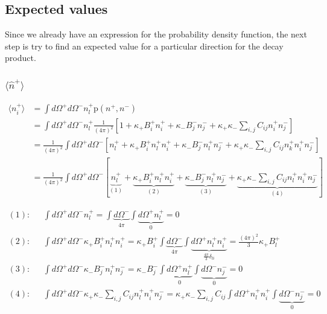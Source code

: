 \documentclass[onecolumn, amsmath, amssymb, aps, prd]{revtex4-2}
\begin{document}
	\subsection{Expected values}
		Since we already have an expression for the probability density function, the next step is try to find an expected value for a particular direction for the decay product.

		\subsubsection{$\langle \hat{n}^+ \rangle$}
			\begin{equation}
				\begin{split}
					\langle n_i^+ \rangle & = \int d\Omega^+ d\Omega^- n_l^+ \text{p}(n^+, n^-) \\
					& = \int d\Omega^+ d\Omega^- n_l^+ \frac{1}{(4\pi)^2} \left[ 1 + \kappa_+ B_i^+ n_i^+ + \kappa_- B_j^- n_j^- + \kappa_+ \kappa_- \sum_{i,j} C_{ij} n_i^+ n_j^- \right] \\
					& = \frac{1}{(4\pi)^2} \int d\Omega^+ d\Omega^- \left[ n_l^+ + \kappa_+ B_i^+ n_l^+ n_i^+ + \kappa_- B_j^- n_l^+ n_j^- + \kappa_+ \kappa_- \sum_{i,j} C_{ij} n_k^+ n_i^+ n_j^- \right] \\
					& = \frac{1}{(4\pi)^2} \int d\Omega^+ d\Omega^- \left[ \underbrace{n_l^+}_{(1)} + \underbrace{\kappa_+ B_i^+ n_l^+ n_i^+}_{(2)} + \underbrace{\kappa_- B_j^- n_l^+ n_j^-}_{(3)} + \underbrace{\kappa_+ \kappa_- \sum_{i,j} C_{ij} n_l^+ n_i^+ n_j^-}_{(4)} \right]
				\end{split}
			\end{equation}

			\begin{equation}
				\begin{split}
					(1): \ \ \ & \int d\Omega^+ d\Omega^- n_l^+ = \int \underbrace{d\Omega^-}_{4\pi} \int \underbrace{d\Omega^+ n_l^+}_{0} = 0 \\
					(2): \ \ \ & \int d\Omega^+ d\Omega^- \kappa_+ B_i^+ n_l^+ n_i^+ = \kappa_+ B_i^+  \int \underbrace{d\Omega^-}_{4\pi} \int \underbrace{d\Omega^+ n_l^+ n_i^+}_{\frac{4\pi}{3}\delta_{li}} = \frac{(4\pi)^2}{3} \kappa_+ B_l^+ \\
					(3): \ \ \ & \int d\Omega^+ d\Omega^- \kappa_- B_j^- n_l^+ n_j^- = \kappa_- B_j^- \int \underbrace{d\Omega^+ n_l^+}_{0} \int \underbrace{d\Omega^- n_j^-}_{0} = 0 \\
					(4): \ \ \ & \int d\Omega^+ d\Omega^- \kappa_+ \kappa_- \sum_{i,j} C_{ij} n_l^+ n_i^+ n_j^- = \kappa_+ \kappa_- \sum_{i,j} C_{ij} \int d\Omega^+ n_l^+ n_i^+ \int \underbrace{d\Omega^- n_j^-}_{0} = 0
				\end{split}
			\end{equation}
\end{document}
